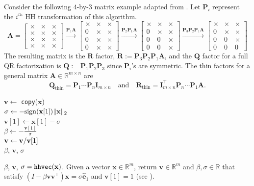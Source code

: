 \documentclass[review,onefignum,onetabnum]{siamart190516}
\newcommand{\R}{\mathbb{R}}
\newcommand{\bb}[1]{\mathbf{#1}}
\begin{document}
Consider the following $4$-by-$3$ matrix example adapted from \cite{Higham2002}. 
Let $\bb{P}_{i}$ represent the $i^{th}$ HH transformation of this algorithm. 
\[\scriptstyle\bb{A} = \left[ \begin{array}{ccc}
\times & \times & \times \\
\times & \times & \times \\
\times & \times & \times \\
\times & \times & \times
\end{array}
\right]\xrightarrow{\bb{P}_{1}\bb{A}}\left[ \begin{array}{c|cc}
\times & \times & \times \\ \hline
0 & \times & \times \\
0 & \times & \times \\
0 & \times & \times
\end{array}
\right]
\xrightarrow{\bb{P}_{2}\bb{P}_{1}\bb{A}}\left[
\begin{array}{cc|c}
\times & \times & \times \\
0 & \times & \times \\ \hline
0 & 0 & \times \\
0 & 0 & \times 
\end{array} \right]
\xrightarrow{\bb{P}_{3}\bb{P}_{2}\bb{P}_{1}\bb{A}} \left[ \begin{array}{ccc}
\times & \times & \times \\
0 & \times & \times \\
0 & 0 & \times \\
0 & 0 & 0 
\end{array}\right]\]
The resulting matrix is the $\bb{R}$ factor, $\bb{R}:= \bb{P}_{3}\bb{P}_{2}\bb{P}_{1}\bb{A}$, and the $\bb{Q}$ factor for a full QR factorization is $\bb{Q}:=\bb{P}_{1}\bb{P}_{2}\bb{P}_{3}$ since $\bb{P}_{i}$'s are symmetric.
The thin factors for a general matrix $\bb{A}\in\R^{m\times n}$ are
\begin{equation}
\bb{Q}_{\text{thin}} = \bb{P}_{1} \cdots \bb{P}_{n}\bb{I}_{m\times n}\quad \text{and} \quad \bb{R}_{\text{thin}} = \bb{I}_{m\times n}^{\top}\bb{P}_{n}\cdots \bb{P}_{1}\bb{A}.
\end{equation}

\begin{algorithm2e}[H]
	\DontPrintSemicolon %
	\KwIn{$\bb{x}$ \hfill \textbf{Output: }$\bb{v}$, $\sigma$, and $\beta $}
	$\bb{v}\gets$ {\tt copy}($\bb{x}$)\\
	$\sigma \gets -\rm{sign}(\bb{x}[1])\|\bb{x}\|_2$\\
	$\bb{v}[1] \gets \bb{x}[1]-\sigma$ \\
	$\beta \gets -\frac{\bb{v}[1]}{\sigma}$\\
	${\bf v} \leftarrow {\bf v} / {\bf v}[1]$\\
	\Return $\beta$, $\bb{v}$, $\sigma$
	\caption{$\beta$, $\bb{v}$, $\sigma = {\tt hhvec}(\bb{x})$. Given a vector $\bb{x}\in\R^m$, return $\bb{v}\in\R^m$ and $\beta,\sigma\in\R$ that satisfy $(I-\beta \bb{v}\bb{v}^{\top})\bb{x} =\sigma\hat{\bb{e}}_{1}$ and $\bb{v}[1]=1$ (see \cite{LAPACK, Higham2002}).}
	\label{algo:hh_v2}
\end{algorithm2e}
\end{document}
